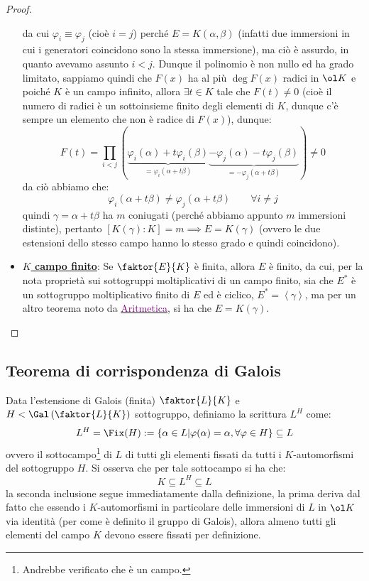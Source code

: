 \documentclass[11pt]{scrartcl}
\begin{document}
\begin{proof}
\begin{itemize}
\[            \]
        da cui $\varphi_i \equiv \varphi_j$ (cioè $i = j$) perché $E = K(\alpha,\beta)$ (infatti due immersioni in cui i generatori coincidono sono la stessa immersione), ma ciò è assurdo, in quanto avevamo assunto $i < j$. Dunque il polinomio è non nullo ed ha grado limitato, 
        sappiamo quindi che $F(x)$ ha al più $\deg F(x)$ radici in $\ol K$ e poiché $K$ è un campo infinito, allora $\exists t \in K$ tale che $F(t) \ne 0$ (cioè il numero di radici è un sottoinsieme finito degli elementi di $K$, dunque c'è sempre un elemento che non è radice di $F(x)$), dunque:
        \[ F(t) = \prod_{i<j} (\underbrace{\varphi_i(\alpha)+t\varphi_i(\beta)}_{ = \varphi_i(\alpha+t\beta)}\underbrace{-\varphi_j(\alpha)-t\varphi_j(\beta)}_{ = -\varphi_j(\alpha+t\beta)}) \ne 0
            \]
        da ciò abbiamo che:
        \[ \varphi_i(\alpha+t\beta) \ne \varphi_j(\alpha+t\beta) \qquad \forall i \ne j
            \]
        quindi $\gamma = \alpha+t\beta$ ha $m$ coniugati (perché abbiamo appunto $m$ immersioni distinte), pertanto $[K(\gamma) : K] = m \implies E = K(\gamma)$ (ovvero le due estensioni dello stesso campo hanno lo stesso grado e quindi coincidono).
        \item \underline{\textbf{$K$ campo finito}}: Se $\faktor{E}{K}$ è finita, allora $E$ è finito, da cui, per la nota proprietà sui sottogruppi moltiplicativi di un campo finito, sia che $E^*$ è un 
        sottogruppo moltiplicativo finito di $E$ ed è ciclico, $E^* = \left<\gamma\right>$, ma per un altro teorema noto da \href{https://github.com/diego-unipi/Appunti-Aritmetica}{\textcolor{purple}{Aritmetica}}, si ha che $E = K(\gamma)$.
        \end{itemize}
\end{proof}

\newpage
\subsection{Teorema di corrispondenza di Galois}
Data l'estensione di Galois (finita) $\faktor{L}{K}$ e $H < \Gal\left(\faktor{L}{K}\right)$ sottogruppo, definiamo la scrittura $L^H$ come:
\[ L^H = \Fix(H) := \{ \alpha \in L | \varphi(\alpha) = \alpha, \forall \varphi \in H \} \subseteq L
    \]
ovvero il sottocampo\footnote{Andrebbe verificato che è un campo.} di $L$ di tutti gli elementi fissati da tutti i $K$-automorfismi del sottogruppo $H$. Si osserva che per tale sottocampo si ha che:
\[ K \subseteq L^H \subseteq L
    \]
la seconda inclusione segue immediatamente dalla definizione, la prima deriva dal fatto che essendo i $K$-automorfismi in particolare delle immersioni di $L$ in $\ol K$ via identità (per come è definito il gruppo di Galois), allora almeno tutti gli elementi del campo $K$ devono essere fissati 
per definizione.
\end{document}
